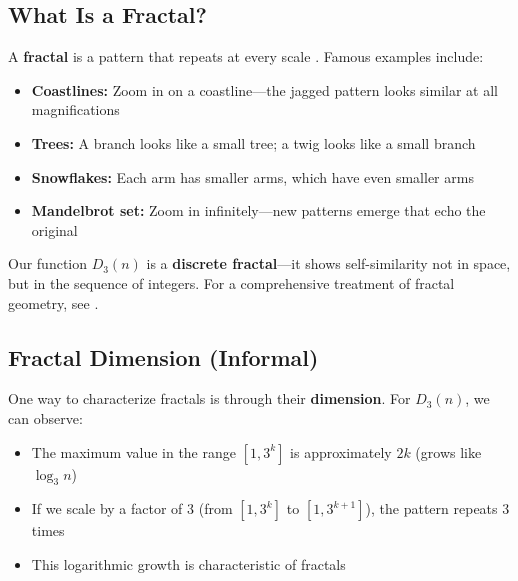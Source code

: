 \subsection{What Is a Fractal?}
\label{subsec:what-is-fractal}


\begin{intuitive}
A \textbf{fractal} is a pattern that repeats at every scale \cite{mandelbrot1982}. Famous examples include:

\begin{itemize}
\item \textbf{Coastlines:} Zoom in on a coastline—the jagged pattern looks similar at all magnifications
\item \textbf{Trees:} A branch looks like a small tree; a twig looks like a small branch
\item \textbf{Snowflakes:} Each arm has smaller arms, which have even smaller arms
\item \textbf{Mandelbrot set:} Zoom in infinitely—new patterns emerge that echo the original
\end{itemize}

Our function $D_3(n)$ is a \textbf{discrete fractal}—it shows self-similarity not in space, but in the sequence of integers. For a comprehensive treatment of fractal geometry, see \cite{falconer2004}.
\end{intuitive}

\subsection{Fractal Dimension (Informal)}
\label{subsec:fractal-dimension}


One way to characterize fractals is through their \textbf{dimension}. For $D_3(n)$, we can observe:

\begin{itemize}
\item The maximum value in the range $[1, 3^k]$ is approximately $2k$ (grows like $\log_3 n$)
\item If we scale by a factor of 3 (from $[1, 3^k]$ to $[1, 3^{k+1}]$), the pattern repeats 3 times
\item This logarithmic growth is characteristic of fractals
\end{itemize}

